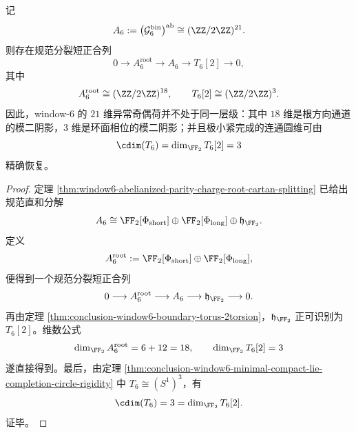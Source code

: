 \begin{corollary}\label{cor:conclusion-window6-anomaly-toral-quotient-mod2-recovery}
记
\[
A_6:=\bigl(\mathcal G_6^{\mathrm{bin}}\bigr)^{\mathrm{ab}}
\cong
(\ZZ/2\ZZ)^{21}.
\]
则存在规范分裂短正合列
\[
0\longrightarrow A_6^{\mathrm{root}}
\longrightarrow A_6
\longrightarrow T_6[2]
\longrightarrow 0,
\]
其中
\[
A_6^{\mathrm{root}}\cong (\ZZ/2\ZZ)^{18},
\qquad
T_6[2]\cong (\ZZ/2\ZZ)^3.
\]
因此，window-\(6\) 的 \(21\) 维异常奇偶荷并不处于同一层级：其中 \(18\) 维是根方向通道的模二阴影，\(3\) 维是环面相位的模二阴影；并且极小紧完成的连通圆维可由
\[
\cdim(T_6)=\dim_{\FF_2}T_6[2]=3
\]
精确恢复。
\end{corollary}
\begin{proof}
定理 \ref{thm:window6-abelianized-parity-charge-root-cartan-splitting} 已给出规范直和分解
\[
A_6
\cong
\FF_2[\Phi_{\mathrm{short}}]
\oplus
\FF_2[\Phi_{\mathrm{long}}]
\oplus
\mathfrak h_{\FF_2}.
\]
定义
\[
A_6^{\mathrm{root}}
:=
\FF_2[\Phi_{\mathrm{short}}]\oplus \FF_2[\Phi_{\mathrm{long}}],
\]
便得到一个规范分裂短正合列
\[
0\longrightarrow A_6^{\mathrm{root}}
\longrightarrow A_6
\longrightarrow \mathfrak h_{\FF_2}
\longrightarrow 0.
\]
再由定理 \ref{thm:conclusion-window6-boundary-torus-2torsion}，\(\mathfrak h_{\FF_2}\) 正可识别为 \(T_6[2]\)。维数公式
\[
\dim_{\FF_2}A_6^{\mathrm{root}}=6+12=18,
\qquad
\dim_{\FF_2}T_6[2]=3
\]
遂直接得到。最后，由定理 \ref{thm:conclusion-window6-minimal-compact-lie-completion-circle-rigidity} 中 \(T_6\cong (S^1)^3\)，有
\[
\cdim(T_6)=3=\dim_{\FF_2}T_6[2].
\]
证毕。
\end{proof}

